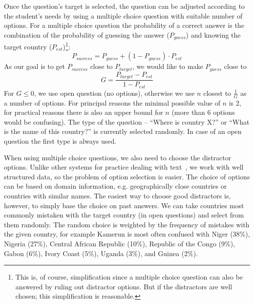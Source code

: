 \documentclass{edm_template}
\begin{document}
Once the question's target is selected, the question can be adjusted according
to the student's needs by using a multiple choice question with suitable number
of options. For a multiple choice question the probability of a correct answer
is the combination of the probability of guessing the answer
($P_\mathit{guess}$) and knowing the target country
($P_\mathit{est}$)\footnote{This is, of course, simplification since a multiple
  choice question can also be answered by ruling out distractor options. But if
  the distractors are well chosen; this simplification is reasonable. }:
\begin{displaymath}
  P_\mathit{success} = P_\mathit{guess} + (1 - P_\mathit{guess}) \cdot P_\mathit{est}
\end{displaymath}
As our goal is to get $P_\mathit{success}$ close to $P_\mathit{target}$, we
would like to make $P_\mathit{guess}$ close to
\begin{displaymath}
   G = \frac{P_\mathit{target} - P_\mathit{est}}{1 - P_\mathit{est}}
\end{displaymath}
For $G \leq 0$, we use open question (no options), otherwise we use $n$ closest
to $\frac{1}{G}$ as a number of options. For principal reasons the minimal
possible value of $n$ is 2, for practical reasons there is also an upper bound
for $n$ (more than 6 options would be confusing). The type of the question --
``Where is country X?'' or ``What is the name of this country?'' is currently
selected randomly. In case of an open question the first type is always used.

When using multiple choice questions, we also need to choose the distractor
options. Unlike other systems for practice dealing with
text~\cite{mitkov2006computer,mostow2002automated}, we work with well
structured data, so the problem of option selection is easier. The choice of
options can be based on domain information, e.g. geographically close
countries or countries with similar names. The easiest way to choose good
distractors is, however, to simply base the choice on past answers. We can take
countries most commonly mistaken with the target country (in open questions)
and select from them randomly. The random choice is weighted by the frequency
of mistakes with the given country, for example Kamerun is most often confused
with Niger (38\%), Nigeria (27\%), Central African Republic (10\%), Republic of
the Congo (9\%), Gabon (6\%), Ivory Coast (5\%), Uganda (3\%), and Guinea
(2\%).


\end{document}
